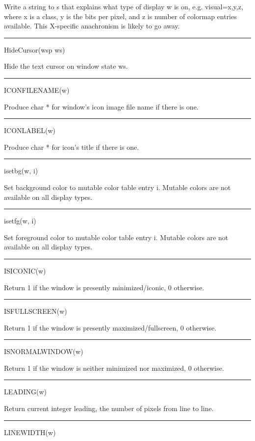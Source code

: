 Write a string to s that explains what type of display w is on,
e.g. {\textquotedbl}visual=x,y,z{\textquotedbl}, where x is a class, y
is the bits per pixel, and z is number of colormap entries
available. This X-specific anachronism is likely to go away.


\bigskip\hrule\vspace{0.1cm}
\noindent
HideCursor(wsp ws)


Hide the text cursor on window state ws.


\bigskip\hrule\vspace{0.1cm}
\noindent
ICONFILENAME(w)


Produce char * for window's icon image file name if there is one.


\bigskip\hrule\vspace{0.1cm}
\noindent
ICONLABEL(w)


Produce char * for icon's title if there is one.


\bigskip\hrule\vspace{0.1cm}
\noindent
isetbg(w, i)


Set background color to mutable color table entry i. Mutable colors
are not available on all display types.


\bigskip\hrule\vspace{0.1cm}
\noindent
isetfg(w, i)


Set foreground color to mutable color table entry i. Mutable colors
are not available on all display types.


\bigskip\hrule\vspace{0.1cm}
\noindent
ISICONIC(w)


Return 1 if the window is presently minimized/iconic, 0 otherwise.


\bigskip\hrule\vspace{0.1cm}
\noindent
ISFULLSCREEN(w)


Return 1 if the window is presently maximized/fullscreen, 0 otherwise.


\bigskip\hrule\vspace{0.1cm}
\noindent
ISNORMALWINDOW(w)


Return 1 if the window is neither minimized nor maximized, 0 otherwise.


\bigskip\hrule\vspace{0.1cm}
\noindent
LEADING(w)


Return current integer leading, the number of pixels from line to line.


\bigskip\hrule\vspace{0.1cm}
\noindent
LINEWIDTH(w)



